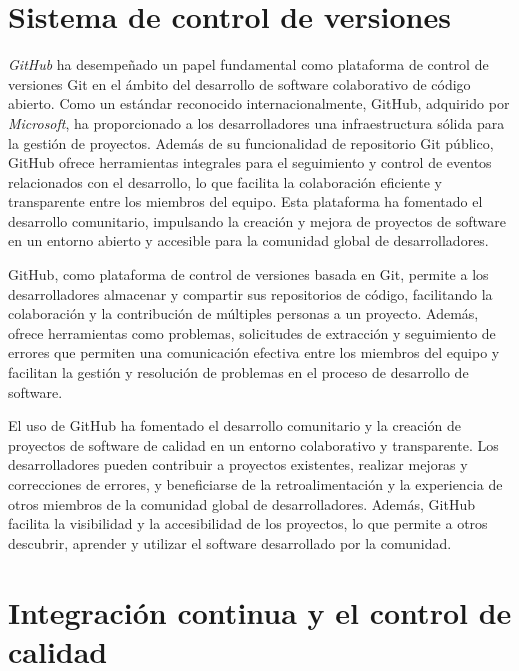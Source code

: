 \section{Sistema de control de versiones}

\textit{GitHub} ha desempeñado un papel fundamental como plataforma de control de versiones Git en el ámbito del 
desarrollo de software colaborativo de código abierto. Como un estándar reconocido internacionalmente, 
GitHub, adquirido por \textit{Microsoft}, ha proporcionado a los desarrolladores una infraestructura sólida para
la gestión de proyectos. Además de su funcionalidad de repositorio Git público, GitHub ofrece 
herramientas integrales para el seguimiento y control de eventos relacionados con el desarrollo, 
lo que facilita la colaboración eficiente y transparente entre los miembros del equipo. 
Esta plataforma ha fomentado el desarrollo comunitario, impulsando la creación y mejora de proyectos 
de software en un entorno abierto y accesible para la comunidad global de 
desarrolladores.

GitHub, como plataforma de control de versiones basada en Git, permite a los desarrolladores 
almacenar y compartir sus repositorios de código, facilitando la colaboración y la contribución 
de múltiples personas a un proyecto. Además, ofrece herramientas como problemas, solicitudes de 
extracción y seguimiento de errores que permiten una comunicación efectiva entre los miembros del 
equipo y facilitan la gestión y resolución de problemas en el proceso de desarrollo de 
software.

El uso de GitHub ha fomentado el desarrollo comunitario y la creación de proyectos de software 
de calidad en un entorno colaborativo y transparente. Los desarrolladores pueden contribuir 
a proyectos existentes, realizar mejoras y correcciones de errores, y beneficiarse de la 
retroalimentación y la experiencia de otros miembros de la comunidad global de desarrolladores. 
Además, GitHub facilita la visibilidad y la accesibilidad de los proyectos, lo que permite a otros 
descubrir, aprender y utilizar el software desarrollado por la comunidad.

\section{Integración continua y el control de calidad}


